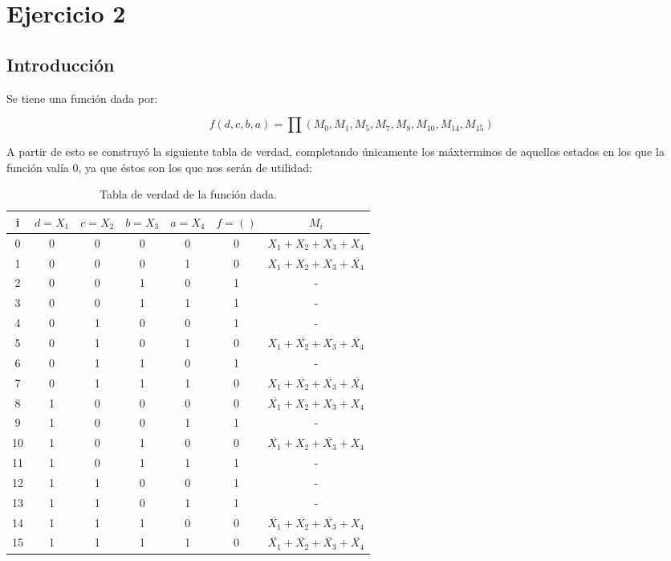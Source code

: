 \section{Ejercicio 2}
\subsection{Introducción}
\newcommand\Tstrut{\rule{0pt}{2.4ex}}
Se tiene una función dada por:

\[
	f(d,c,b,a)=\prod\left(M_{0},M_{1},M_{5},M_{7},M_{8},M_{10},M_{14},M_{15}\right)
\]

A partir de esto se construyó la siguiente tabla de verdad, completando únicamente los máxterminos de aquellos estados en los que la función valía 0, ya que éstos son los que nos serán de utilidad:

\begin{table}[h!]
    \begin{center}
        \begin{tabular}{|c|c|c|c|c|c|c|}
        \hline
        i   & $d=X_1$ & $c=X_2$ & $b=X_3$ & $a=X_4$ & $f=()$ & $M_i$ \\\hline
        0   &  0 & 0 & 0 & 0 & 0 & \(X_{1}+X_{2}+X_{3}+X_{4}\) \\ \hline
        1   &  0 & 0 & 0 & 1 & 0 & \(X_{1}+X_{2}+X_{3}+\overline{X_{4}}\)\Tstrut\\ \hline
        2   &  0 & 0 & 1 & 0 & 1 & -\\ \hline
        3   &  0 & 0 & 1 & 1 & 1 & -\\ \hline
        4   &  0 & 1 & 0 & 0 & 1 & -\\\hline
        5   &  0 & 1 & 0 & 1 & 0 & \(X_{1}+\overline{X_{2}}+X_{3}+\overline{X_{4}}\)\Tstrut\\ \hline
        6   &  0 & 1 & 1 & 0 & 1 & -\\ \hline
        7   &  0 & 1 & 1 & 1 & 0 & \(X_{1}+\overline{X_{2}}+\overline{X_{3}}+\overline{X_{4}}\)\Tstrut\\ \hline
        8   &  1 & 0 & 0 & 0 & 0 & \(\overline{X_{1}}+X_{2}+X_{3}+X_{4}\)\Tstrut\\ \hline
        9   &  1 & 0 & 0 & 1 & 1 & -\\ \hline
        10  &  1 & 0 & 1 & 0 & 0 & \(\overline{X_{1}}+X_{2}+\overline{X_{3}}+X_{4}\)\Tstrut\\ \hline
        11  &  1 & 0 & 1 & 1 & 1 & -\\ \hline
        12  &  1 & 1 & 0 & 0 & 1 & -\\ \hline
        13  &  1 & 1 & 0 & 1 & 1 & -\\ \hline
        14  &  1 & 1 & 1 & 0 & 0 & \(\overline{X_{1}}+\overline{X_{2}}+\overline{X_{3}}+X_{4}\)\Tstrut\\ \hline
        15  &  1 & 1 & 1 & 1 & 0 & \(\overline{X_{1}}+\overline{X_{2}}+\overline{X_{3}}+\overline{X_{4}}\)\Tstrut\\ \hline
        \end{tabular}
    \caption{Tabla de verdad de la función dada.}
    \end{center}
    \label{table:2.1}
\end{table}

